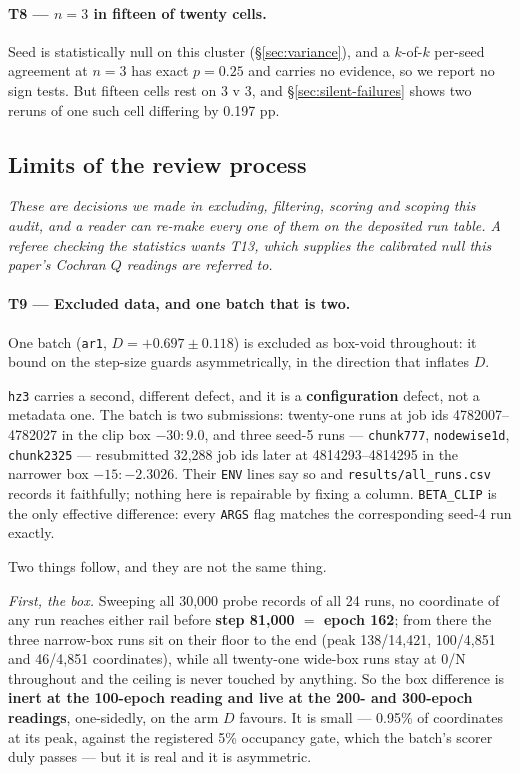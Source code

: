 \documentclass[10pt,letterpaper]{article}
\newcommand{\Dstat}{D}                         %
\newcommand{\arm}[1]{\texttt{#1}}
\begin{document}
\paragraph{T8 --- $n = 3$ in fifteen of twenty cells.}
Seed is statistically null on this cluster (\S\ref{sec:variance}), and a $k$-of-$k$ per-seed
agreement at $n = 3$ has exact $p = 0.25$ and carries no evidence, so we report no sign tests. But
fifteen cells rest on 3 v 3, and \S\ref{sec:silent-failures} shows two reruns of one such cell
differing by 0.197 pp.

\subsection{Limits of the review process}
\label{sec:threats-process}

\emph{These are decisions we made in excluding, filtering, scoring and scoping this audit, and a
reader can re-make every one of them on the deposited run table. A referee checking the statistics
wants T13, which supplies the calibrated null this paper's Cochran $Q$ readings are referred to.}

\paragraph{T9 --- Excluded data, and one batch that is two.}
One batch (\arm{ar1}, $\Dstat = +0.697 \pm 0.118$) is excluded as box-void throughout: it bound on
the step-size guards asymmetrically, in the direction that inflates $\Dstat$.

\arm{hz3} carries a second, different defect, and it is a \textbf{configuration} defect, not a
metadata one. The batch is two submissions: twenty-one runs at job ids 4782007--4782027 in the clip
box $-30{:}9.0$, and three seed-5 runs --- \arm{chunk777}, \arm{nodewise1d}, \arm{chunk2325} ---
resubmitted 32{,}288 job ids later at 4814293--4814295 in the narrower box $-15{:}{-}2.3026$. Their
\texttt{ENV} lines say so and \texttt{results/all\_runs.csv} records it faithfully; nothing here is
repairable by fixing a column. \texttt{BETA\_CLIP} is the only effective difference: every
\texttt{ARGS} flag matches the corresponding seed-4 run exactly.

Two things follow, and they are not the same thing.

\emph{First, the box.} Sweeping all 30{,}000 probe records of all 24 runs, no coordinate of any run
reaches either rail before \textbf{step 81{,}000 $=$ epoch 162}; from there the three narrow-box
runs sit on their floor to the end (peak 138/14{,}421, 100/4{,}851 and 46/4{,}851 coordinates),
while all twenty-one wide-box runs stay at 0/N throughout and the ceiling is never touched by
anything. So the box difference is \textbf{inert at the 100-epoch reading and live at the 200- and
300-epoch readings}, one-sidedly, on the arm $\Dstat$ favours. It is small --- 0.95\% of
coordinates at its peak, against the registered 5\% occupancy gate, which the batch's scorer duly
passes --- but it is real and it is asymmetric.
\end{document}
